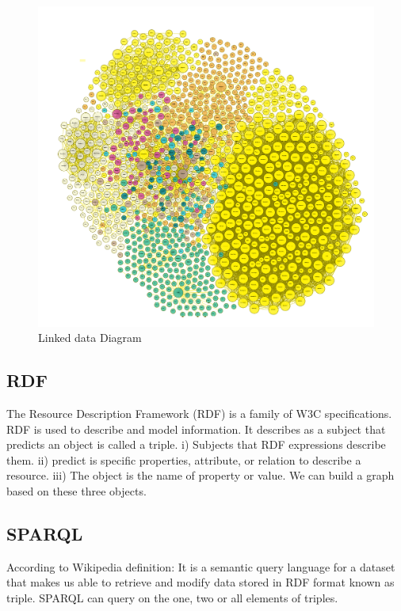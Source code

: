 \begin{center}
	\begin{figure}[htb!]
		
		\begin{minipage}{0.55\linewidth}
			\centering
			\includegraphics[width=1.55\textwidth]{images/chap02_LinkData.png}
		\end{minipage}
		\caption[Linked data diagram]{Linked data Diagram\cite{Hector}}
		
		
	\end{figure}
	
\end{center}
\subsection{RDF}
The Resource Description Framework (RDF) is a family
of W3C specifications. RDF is used to describe and model information. It describes as a subject that predicts an object is called a triple.
i) Subjects that RDF expressions describe them.
ii) predict is specific properties, attribute, or relation to describe a resource.
iii) The object is the name of property or value.
We can build a graph based on these three objects\cite{Hector}.

\subsection{SPARQL}
According to Wikipedia definition: It is a semantic query language for a dataset that makes us able to retrieve and modify data stored in RDF format known as triple. SPARQL can query on the one, two or all elements of triples.    

